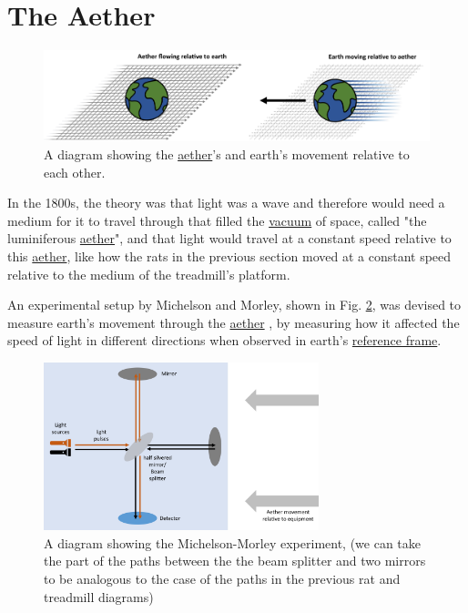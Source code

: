 \section{The Aether}%


\begin{figure}[ht]
	\centering
	\includegraphics[width=\textwidth]{images/pdf/earth_and_aether.pdf}
	\caption{A diagram showing the \protect\hyperlink{def-aether}{aether}'s and earth's movement relative to each other.}
	\label{fig: Aether}
\end{figure}

In the 1800s, the theory was that light was a wave and therefore would need a medium for it to travel through that filled the \hyperlink{def-vacuum}{vacuum} of space, called "the luminiferous \hyperlink{def-aether}{aether}", and that light would travel at a constant speed relative to this \hyperlink{def-aether}{aether}, like how the rats in the previous section moved at a constant speed relative to the medium of the treadmill's platform.

An experimental setup by Michelson and Morley, shown in Fig. \ref{fig: Michelson_morley}, was devised to measure earth's movement through the \hyperlink{def-aether}{aether} \cite{EtherExperiment}, by measuring how it affected the speed of light in different directions when observed in earth's \hyperlink{def-Reference-frame}{reference frame}.

\begin{figure}[H]
	\centering
	\includegraphics[width=8cm]{images/pdf/Michelson_morley.pdf}
	\caption{A diagram showing the Michelson-Morley experiment, (we can take the part of the paths between the the beam splitter and two mirrors to be analogous to the case of the paths in the previous rat and treadmill diagrams) }
	\label{fig: Michelson_morley}
\end{figure}

